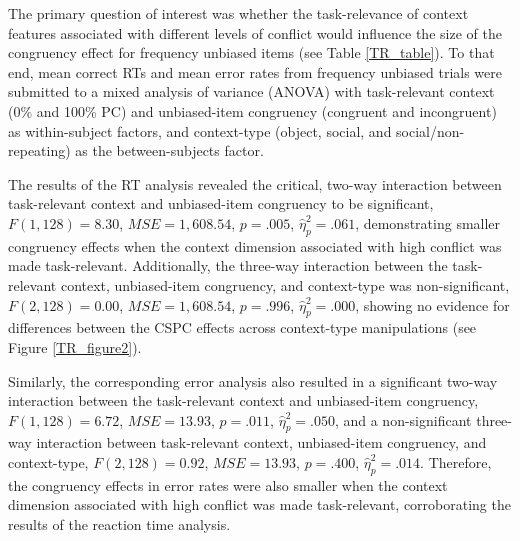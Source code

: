 \documentclass[]{DissertateCUNY}
\begin{document}
The primary question of interest was whether the task-relevance of
context features associated with different levels of conflict would
influence the size of the congruency effect for frequency unbiased items
(see Table \ref{TR_table}). To that end, mean correct RTs and mean error
rates from frequency unbiased trials were submitted to a mixed analysis
of variance (ANOVA) with task-relevant context (0\% and 100\% PC) and
unbiased-item congruency (congruent and incongruent) as within-subject
factors, and context-type (object, social, and social/non-repeating) as
the between-subjects factor.

The results of the RT analysis revealed the critical, two-way
interaction between task-relevant context and unbiased-item congruency
to be significant, \(F(1, 128) = 8.30\), \(\mathit{MSE} = 1,608.54\),
\(p = .005\), \(\hat{\eta}^2_p = .061\), demonstrating smaller
congruency effects when the context dimension associated with high
conflict was made task-relevant. Additionally, the three-way interaction
between the task-relevant context, unbiased-item congruency, and
context-type was non-significant, \(F(2, 128) = 0.00\),
\(\mathit{MSE} = 1,608.54\), \(p = .996\), \(\hat{\eta}^2_p = .000\),
showing no evidence for differences between the CSPC effects across
context-type manipulations (see Figure \ref{TR_figure2}).

Similarly, the corresponding error analysis also resulted in a
significant two-way interaction between the task-relevant context and
unbiased-item congruency, \(F(1, 128) = 6.72\),
\(\mathit{MSE} = 13.93\), \(p = .011\), \(\hat{\eta}^2_p = .050\), and a
non-significant three-way interaction between task-relevant context,
unbiased-item congruency, and context-type, \(F(2, 128) = 0.92\),
\(\mathit{MSE} = 13.93\), \(p = .400\), \(\hat{\eta}^2_p = .014\).
Therefore, the congruency effects in error rates were also smaller when
the context dimension associated with high conflict was made
task-relevant, corroborating the results of the reaction time analysis.
\end{document}
